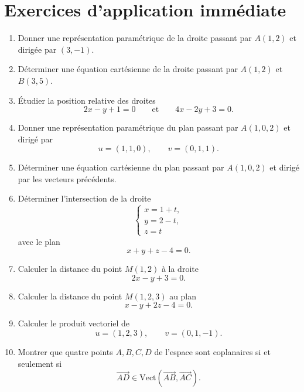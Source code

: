 \documentclass[11pt,a4paper]{article}
\theoremstyle{remark}
\newcommand{\Vect}{\mathrm{Vect}}
\begin{document}
\section*{Exercices d’application immédiate}

\begin{enumerate}[label=\textbf{Exercice \arabic*.}]
    \item Donner une représentation paramétrique de la droite passant par \(A(1,2)\) et dirigée par \((3,-1)\).

    \item Déterminer une équation cartésienne de la droite passant par \(A(1,2)\) et \(B(3,5)\).

    \item Étudier la position relative des droites
    \[
    2x-y+1=0
    \qquad \text{et} \qquad
    4x-2y+3=0.
    \]

    \item Donner une représentation paramétrique du plan passant par \(A(1,0,2)\) et dirigé par
    \[
    u=(1,1,0),\qquad v=(0,1,1).
    \]

    \item Déterminer une équation cartésienne du plan passant par \(A(1,0,2)\) et dirigé par les vecteurs précédents.

    \item Déterminer l’intersection de la droite
    \[
    \begin{cases}
    x=1+t,\\
    y=2-t,\\
    z=t
    \end{cases}
    \]
    avec le plan
    \[
    x+y+z-4=0.
    \]

    \item Calculer la distance du point \(M(1,2)\) à la droite
    \[
    2x-y+3=0.
    \]

    \item Calculer la distance du point \(M(1,2,3)\) au plan
    \[
    x-y+2z-4=0.
    \]

    \item Calculer le produit vectoriel de
    \[
    u=(1,2,3),\qquad v=(0,1,-1).
    \]

    \item Montrer que quatre points \(A,B,C,D\) de l’espace sont coplanaires si et seulement si
    \[
    \overrightarrow{AD}\in \Vect(\overrightarrow{AB},\overrightarrow{AC}).
    \]
\end{enumerate}
\end{document}

